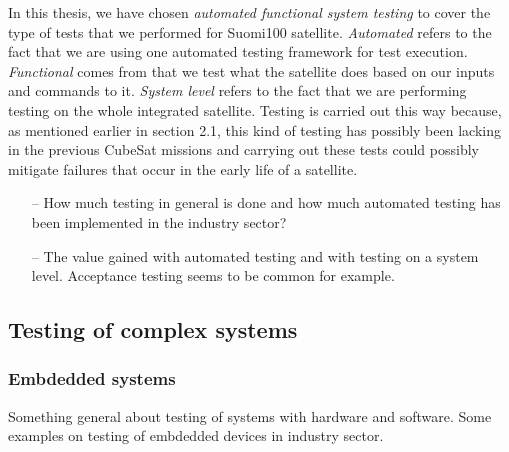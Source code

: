 \documentclass[english,12pt,a4paper,pdftex,elec,utf8]{aaltothesis}
\begin{document}
\vspace{5mm}
In this thesis, we have chosen \textit{automated functional system testing} to cover the type of tests that we performed for Suomi100 satellite. \textit{Automated} refers to the fact that we are using one automated testing framework for test execution. \textit{Functional} comes from that we test what the satellite does based on our inputs and commands to it. \textit{System level} refers to the fact that we are performing testing on the whole integrated satellite. Testing is carried out this way because, as mentioned earlier in section 2.1, this kind of testing has possibly been lacking in the previous CubeSat missions and carrying out these tests could possibly mitigate failures that occur in the early life of a satellite.
\begin{itemize}
\item[--]How much testing in general is done and how much automated testing has been implemented in the industry sector?
\item[--]The value gained with automated testing and with testing on a system level. Acceptance testing seems to be common for example.
\end{itemize}
\subsection{Testing of complex systems}
\subsubsection{Embdedded systems}
Something general about testing of systems with hardware and software.
Some examples on testing of embdedded devices in industry sector.\par 
\end{document}
